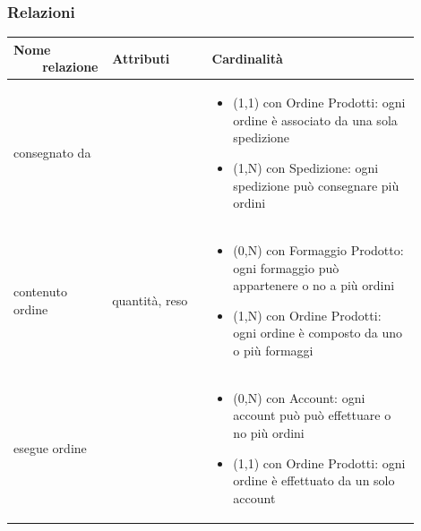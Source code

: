 \documentclass[12pt,a4paper]{article}
\begin{document}
\subsubsection{Relazioni}
\label{Store Relazioni}
\begin{center}

\setlength{\extrarowheight}{1.5pt}

\begin{longtable}{|p{0.16\linewidth}|p{0.24\linewidth}|p{0.50\linewidth}|}

\hline 
\textbf{Nome \ \ \ \ relazione} 	& \textbf{Attributi} & \textbf{Cardinalità}\\ 

    
\hline
consegnato da 				& \begin{flushleft}\vspace{-15pt}  \end{flushleft}
					& \begin{itemize}
						\setlength{\itemindent}{-1em}
						\vspace{-25pt}
						\setlength\itemsep{-0.25em}
						\item (1,1) con Ordine Prodotti: ogni ordine è associato da una sola spedizione
						\item (1,N) con Spedizione: ogni spedizione può consegnare più ordini
					\end{itemize}\\ 

\hline
contenuto ordine 				& \begin{flushleft}\vspace{-25pt} quantità, reso \end{flushleft}
					& \begin{itemize}
						\setlength{\itemindent}{-1em}
						\vspace{-25pt}
						\setlength\itemsep{-0.25em}
						\item (0,N) con Formaggio Prodotto: ogni formaggio può appartenere o no a più ordini
						\item (1,N) con Ordine Prodotti: ogni ordine è composto da uno o più formaggi
					\end{itemize}\\ 

\hline
esegue ordine 				& \begin{flushleft}\vspace{-15pt} 
 \end{flushleft}
					& \begin{itemize}
						\setlength{\itemindent}{-1em}
						\vspace{-25pt}
						\setlength\itemsep{-0.25em}
						\item (0,N) con Account: ogni account può può effettuare o no più ordini
						\item (1,1) con Ordine Prodotti: ogni ordine è effettuato da un solo account
					\end{itemize}\\ 


\end{longtable}
\end{center}
\end{document}
